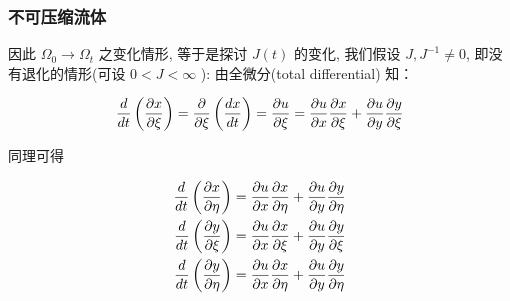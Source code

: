 \documentclass[aspectratio=2516]{beamer}
\begin{document}
\begin{frame}
\frametitle{\kaishu 不可压缩流体}

\kaishu 

\small

因此 ${\Omega _0} \to {\Omega _t}$ 之变化情形, 等于是探讨 $ J\left(t\right) $ 的变化, 我们假设 $ J,J^{-1} \ne 0 $, 即没有退化的情形(可设 $ 0 < J < \infty $ ): 由全微分(total differential) 知：

\begin{equation}
\frac{d}{{dt}}\left( {\frac{{\partial x}}{{\partial \xi }}} \right) = \frac{\partial }{{\partial \xi }}\left( {\frac{{dx}}{{dt}}} \right) = \frac{{\partial u}}{{\partial \xi }} = \frac{{\partial u}}{{\partial x}}\frac{{\partial x}}{{\partial \xi }} + \frac{{\partial u}}{{\partial y}}\frac{{\partial y}}{{\partial \xi }}
\notag 
\end{equation}

同理可得

\begin{equation}
\begin{split}
\frac{d}{{dt}}\left( {\frac{{\partial x}}{{\partial \eta }}} \right) & = \frac{{\partial u}}{{\partial x}}\frac{{\partial x}}{{\partial \eta }} + \frac{{\partial u}}{{\partial y}}\frac{{\partial y}}{{\partial \eta }}\\
\frac{d}{{dt}}\left( {\frac{{\partial y}}{{\partial \xi }}} \right) & = \frac{{\partial u}}{{\partial x}}\frac{{\partial x}}{{\partial \xi }} + \frac{{\partial u}}{{\partial y}}\frac{{\partial y}}{{\partial \xi }} \\
\frac{d}{{dt}}\left( {\frac{{\partial y}}{{\partial \eta }}} \right) & = \frac{{\partial u}}{{\partial x}}\frac{{\partial x}}{{\partial \eta }} + \frac{{\partial u}}{{\partial y}}\frac{{\partial y}}{{\partial \eta }}
\end{split}
\notag 
\end{equation}

\end{frame}

\end{document}
